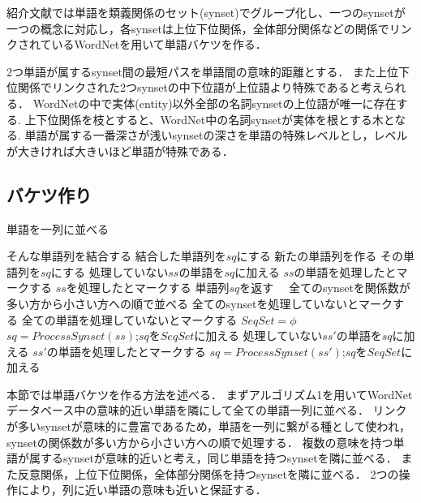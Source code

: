 \documentclass{jsarticle}
\theoremstyle{definition}
\begin{document}
紹介文献では単語を類義関係のセット(synset)でグループ化し、一つのsynsetが一つの概念に対応し，各synsetは上位下位関係，全体部分関係などの関係でリンクされているWordNet\cite{miller_wordnet:_1995}を用いて単語バケツを作る．

2つ単語が属するsynset間の最短パスを単語間の意味的距離とする．
また上位下位関係でリンクされた2つsynsetの中下位語が上位語より特殊であると考えられる．
WordNetの中で実体(entity)以外全部の名詞synsetの上位語が唯一に存在する.
上下位関係を枝とすると、WordNet中の名詞synsetが実体を根とする木となる.
単語が属する一番深さが浅いsynsetの深さを単語の特殊レベルとし，レベルが大きければ大きいほど単語が特殊である．

\subsection{バケツ作り}
\begin{algorithm}
\caption{単語を一列に並べる}
\begin{algorithmic}[1]
	\State そんな単語列を結合する
	\State 結合した単語列を$sq$にする
	\State 新たの単語列を作る
	\State その単語列を$sq$にする
	\EndIf
	\State 処理していない$ss$の単語を$sq$に加える
	\State $ss$の単語を処理したとマークする
	\State $ss$を処理したとマークする
	\State 単語列$sq$を返す　
\EndFunction
{}
	\State 全てのsynsetを関係数が多い方から小さい方への順で並べる
	\State 全てのsynsetを処理していないとマークする
	\State 全ての単語を処理していないとマークする
	\State $SeqSet = \phi$
		\State $sq=ProcessSynset(ss)$;$sq$を$SeqSet$に加える
		\State 処理していない$ss'$の単語を$sq$に加える
		\State $ss'$の単語を処理したとマークする
		\State $sq=ProcessSynset(ss')$;$sq$を$SeqSet$に加える　
		\EndFor
	\EndFor
\EndFunction
\end{algorithmic}
\end{algorithm}

本節では単語バケツを作る方法を述べる．
まずアルゴリズム1を用いてWordNetデータベース中の意味的近い単語を隣にして全ての単語一列に並べる．
リンクが多いsynsetが意味的に豊富であるため，単語を一列に繋がる種として使われ，synsetの関係数が多い方から小さい方への順で処理する．
複数の意味を持つ単語が属するsynsetが意味的近いと考え，同じ単語を持つsynsetを隣に並べる．
また反意関係，上位下位関係，全体部分関係を持つsynsetを隣に並べる．
2つの操作により，列に近い単語の意味も近いと保証する．
\end{document}

